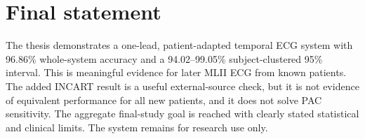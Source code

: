 \section{Final statement}

The thesis demonstrates a one-lead, patient-adapted temporal ECG system with
96.86\% whole-system accuracy and a 94.02--99.05\% subject-clustered 95\%
interval. This is meaningful evidence for later MLII ECG from known patients.
The added INCART result is a useful external-source check, but it is not
evidence of equivalent performance for all new patients, and it does not solve
PAC sensitivity. The aggregate final-study goal is reached with clearly stated
statistical and clinical limits. The system remains for research use only.

